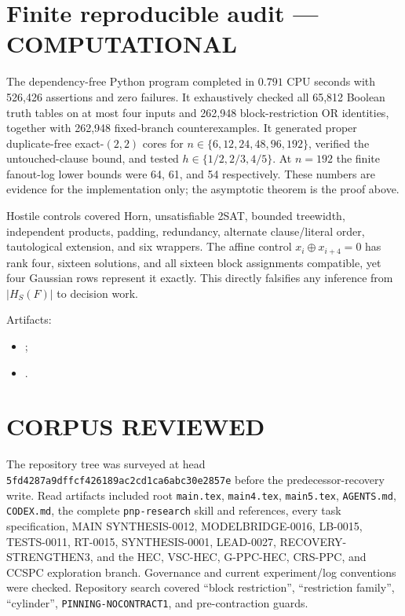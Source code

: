 \documentclass[11pt]{article}
\newcommand{\COMP}{\textbf{COMPUTATIONAL}}
\begin{document}
\section{Finite reproducible audit --- \COMP}

The dependency-free Python program completed in $0.791$ CPU seconds with
526,426 assertions and zero failures.  It exhaustively checked all 65,812
Boolean truth tables on at most four inputs and 262,948 block-restriction OR
identities, together with 262,948 fixed-branch counterexamples.  It generated
proper duplicate-free exact-$(2,2)$ cores for
$n\in\{6,12,24,48,96,192\}$, verified the untouched-clause bound, and tested
$h\in\{1/2,2/3,4/5\}$.  At $n=192$ the finite fanout-log lower bounds were
64, 61, and 54 respectively.  These numbers are evidence for the
implementation only; the asymptotic theorem is the proof above.

Hostile controls covered Horn, unsatisfiable 2SAT, bounded treewidth,
independent products, padding, redundancy, alternate clause/literal order,
tautological extension, and six wrappers.  The affine control
$x_i\oplus x_{i+4}=0$ has rank four, sixteen solutions, and all sixteen block
assignments compatible, yet four Gaussian rows represent it exactly.  This
directly falsifies any inference from $|H_S(F)|$ to decision work.

Artifacts:
\begin{itemize}[leftmargin=1.5em]
\item {};
\item {}.
\end{itemize}

\section{CORPUS REVIEWED}

The repository tree was surveyed at head
\texttt{5fd4287a9dffcf426189ac2cd1ca6abc30e2857e} before the predecessor-recovery
write.  Read artifacts included root \texttt{main.tex}, \texttt{main4.tex},
\texttt{main5.tex}, \texttt{AGENTS.md}, \texttt{CODEX.md}, the complete
\texttt{pnp-research} skill and references, every task specification,
MAIN SYNTHESIS-0012, MODELBRIDGE-0016, LB-0015, TESTS-0011, RT-0015,
SYNTHESIS-0001, LEAD-0027, RECOVERY-STRENGTHEN3, and the HEC, VSC-HEC,
G-PPC-HEC, CRS-PPC, and CCSPC exploration branch.  Governance and current
experiment/log conventions were checked.  Repository search covered
``block restriction'', ``restriction family'', ``cylinder'',
\texttt{PINNING-NOCONTRACT1}, and pre-contraction guards.
\end{document}
